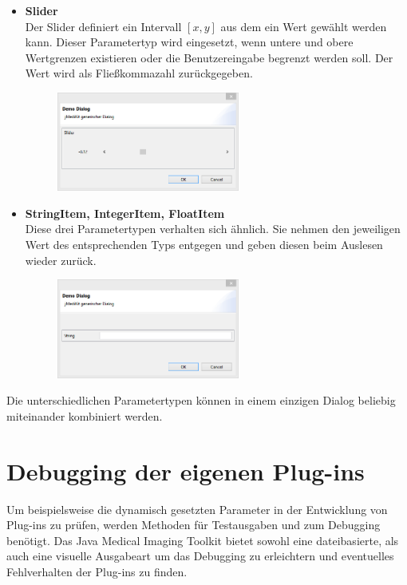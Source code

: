 \begin{itemize}
\item \textbf{Slider}\\
Der Slider definiert ein Intervall $[x,y]$ aus dem ein Wert gewählt werden kann. Dieser Parametertyp wird eingesetzt, wenn untere und obere Wertgrenzen existieren oder die Benutzereingabe begrenzt werden soll. Der Wert wird als Fließkommazahl zurückgegeben.
\begin{figure}[H]
\includegraphics[angle=0,width=6cm]{./img/slider.png}
\end{figure}

\item \textbf{StringItem, IntegerItem, FloatItem}\\
Diese drei Parametertypen verhalten sich ähnlich. Sie nehmen den jeweiligen Wert des entsprechenden Typs entgegen und geben diesen beim Auslesen wieder zurück.
\begin{figure}[H]
\includegraphics[angle=0,width=6cm]{./img/stringitem.png}
\end{figure}

\end{itemize}

Die unterschiedlichen Parametertypen können in einem einzigen Dialog beliebig miteinander kombiniert werden.

\section{Debugging der eigenen Plug-ins}

Um beispielsweise die dynamisch gesetzten Parameter in der Entwicklung von Plug-ins zu prüfen, werden Methoden für Testausgaben und zum Debugging benötigt. 
Das Java Medical Imaging Toolkit bietet sowohl eine dateibasierte, als auch eine visuelle Ausgabeart um das Debugging zu erleichtern und eventuelles Fehlverhalten der Plug-ins zu finden.


